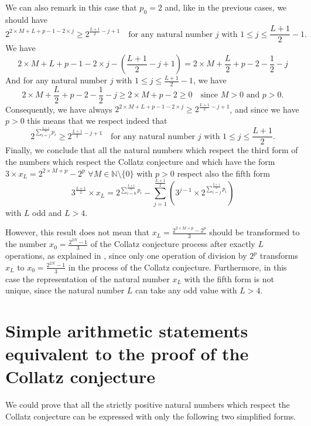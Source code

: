 \documentclass[11pt,a4paper]{article}
\newcommand{\N}{\mathbb{N}}
\newcommand{\Pf}[4]{2^{\sum_{#4=0}^{#1}#3_{#4}}-\sum_{j=1}^{#2}\left(3^{j-1}\times 2^{\sum_{#4=j}^{#1}#3_{#4}}\right)}
\theoremstyle{definition}
\begin{document}
We can also remark in this case that $p_0=2$ and, like in the previous cases, we should have
\begin{equation}
2^{2\times M+L+p-1-2\times j}\ge 2^{\frac{L+1}{2}-j+1}\quad\text{for any natural number }j\text{ with }1\le j\le\frac{L+1}{2}-1.
\end{equation}
We have
\begin{equation}
2\times M+L+p-1-2\times j-\left(\frac{L+1}{2}-j+1\right)=2\times M+\frac L2+p-2-\frac12-j
\end{equation}
And for any natural number $j$ with $1\le j\le\frac{L+1}{2}-1$, we have
\begin{equation}
2\times M+\frac L2+p-2-\frac12-j\ge 2\times M+p-2\ge 0\quad\text{since }M>0\text{ and }p>0.
\end{equation}
Consequently, we have always $2^{2\times M+L+p-1-2\times j}\ge 2^{\frac{L+1}{2}-j+1}$, and
since we have $p>0$ this means that we respect indeed that
\begin{equation}
2^{\sum_{i=j}^{\frac{L+1}{2}}p_i}\ge 2^{\frac{L+1}{2}-j+1}\quad\text{for any natural number }j\text{ with }1\le j\le\frac{L+1}{2}.
\end{equation}
Finally, we conclude that all the natural numbers which respect the third form of the
numbers which respect the Collatz conjecture and which have the form
$3\times x_L=2^{2\times M+p}-2^{p}$ $\forall M\in\N\setminus\{0\}$ with $p>0$ respect also
the fifth form
\[3^{\frac{L+1}{2}}\times x_L=\Pf{\frac{L+1}{2}}{\frac{L+1}{2}}{p}{i}\]
with $L$ odd and $L>4$.

However, this result does not mean that $x_L=\frac{2^{2\times M+p}-2^{p}}{3}$ should be
transformed to the number $x_0=\frac{2^{2N}-1}{3}$ of the Collatz conjecture process after
exactly $L$ operations, as explained in \citep{Louiz2024}, since only one operation of
division by $2^{p}$ transforms $x_L$ to $x_0=\frac{2^{2N}-1}{3}$ in the process of the
Collatz conjecture. Furthermore, in this case the representation of the natural number
$x_L$ with the fifth form is not unique, since the natural number $L$ can take any odd
value with $L>4$.

\section{Simple arithmetic statements equivalent to the proof of the Collatz conjecture}
We could prove that all the strictly positive natural numbers which respect the Collatz
conjecture can be expressed with only the following two simplified forms.
\end{document}
